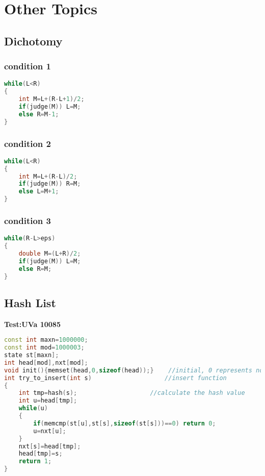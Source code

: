 \chapter{Other Topics}
 \section{Dichotomy}
  \subsection{condition 1}
  \begin{lstlisting}[language=C++]
while(L<R)
{
	int M=L+(R-L+1)/2;
	if(judge(M)) L=M;
	else R=M-1;
}
  \end{lstlisting}

  \subsection{condition 2}
  \begin{lstlisting}[language=C++]
while(L<R)
{
	int M=L+(R-L)/2;
	if(judge(M)) R=M;
	else L=M+1;
}
  \end{lstlisting}

  \subsection{condition 3}
  \begin{lstlisting}[language=C++]
while(R-L>eps)
{
	double M=(L+R)/2;
	if(judge(M)) L=M;
	else R=M;
}
  \end{lstlisting}

 \section{Hash List}
 \textbf{Test:UVa 10085}
 \begin{lstlisting}[language=C++]
const int maxn=1000000;
const int mod=1000003;
state st[maxn];
int head[mod],nxt[mod];
void init(){memset(head,0,sizeof(head));}    //initial, 0 represents nonexist
int try_to_insert(int s)                    //insert function
{
    int tmp=hash(s);                    //calculate the hash value
    int u=head[tmp];
    while(u)
    {
        if(memcmp(st[u],st[s],sizeof(st[s]))==0) return 0;
        u=nxt[u];
    }
    nxt[s]=head[tmp];
    head[tmp]=s;
    return 1;
}
 \end{lstlisting}

